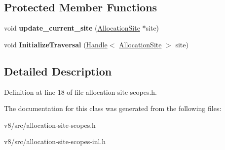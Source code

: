 \subsection*{Protected Member Functions}
\begin{DoxyCompactItemize}
\item 
\mbox{\label{classv8_1_1internal_1_1AllocationSiteContext_a2e094902dbadc8931c82eb04333807c0}} 
void {\bfseries update\+\_\+current\+\_\+site} (\mbox{\hyperlink{classv8_1_1internal_1_1AllocationSite}{Allocation\+Site}} $\ast$site)
\item 
\mbox{\label{classv8_1_1internal_1_1AllocationSiteContext_a2ae0994fc850605cbea75aeddf980b44}} 
void {\bfseries Initialize\+Traversal} (\mbox{\hyperlink{classv8_1_1internal_1_1Handle}{Handle}}$<$ \mbox{\hyperlink{classv8_1_1internal_1_1AllocationSite}{Allocation\+Site}} $>$ site)
\end{DoxyCompactItemize}


\subsection{Detailed Description}


Definition at line 18 of file allocation-\/site-\/scopes.\+h.



The documentation for this class was generated from the following files\+:\begin{DoxyCompactItemize}
\item 
v8/src/allocation-\/site-\/scopes.\+h\item 
v8/src/allocation-\/site-\/scopes-\/inl.\+h\end{DoxyCompactItemize}
